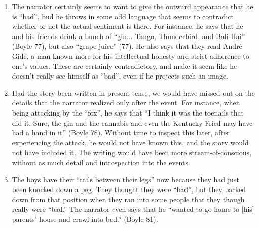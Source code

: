 \documentclass[12pt,letterpaper]{article}
\begin{document}
\begin{enumerate}
\item The narrator certainly seems to want to give the outward appearance that
he is ``bad'', bud he throws in some odd language that seems to contradict
whether or not the actual sentiment is there.  For instance, he says that he and
his friends drink a bunch of ``gin... Tango, Thunderbird, and Bali Hai'' (Boyle
77), but also ``grape juice'' (77).  He also says that they read Andr\'{e} Gide,
a man known more for his intellectual honesty and strict adherence to one's
values.  These are certainly contradictory, and make it seem like he doesn't
really see himself as ``bad'', even if he projects such an image.

\item Had the story been written in present tense, we would have missed out on
the details that the narrator realized only after the event.  For instance, when
being attacking by the ``fox'', he says that ``I think it was the toenails that
did it.  Sure, the gin and the cannabis and even the Kentucky Fried may have had
a hand in it'' (Boyle 78).  Without time to inspect this later, after
experiencing the attack, he would not have known this, and the story would not
have included it.  The writing would have been more stream-of-conscious, without
as much detail and introspection into the events.

\item The boys have their ``tails between their legs'' now because they had just
been knocked down a peg.  They thought they were ``bad'', but they backed down
from that position when they ran into some people that they though really were
``bad.''  The narrator even says that he ``wanted to go home to [his] parents'
house and crawl into bed.'' (Boyle 81).

\end{enumerate}
\end{document}
